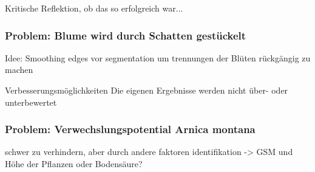 Kritische Reflektion, ob das so erfolgreich war...

\subsubsection{Problem: Blume wird durch Schatten gestückelt}

Idee: Smoothing edges vor segmentation um trennungen der Blüten rückgängig zu machen


Verbesserungsmöglichkeiten
Die eigenen Ergebnisse werden nicht über- oder unterbewertet

\subsubsection{Problem: Verwechslungspotential Arnica montana}

 schwer zu verhindern, aber durch andere faktoren identifikation -> GSM und Höhe der Pflanzen oder Bodensäure?
